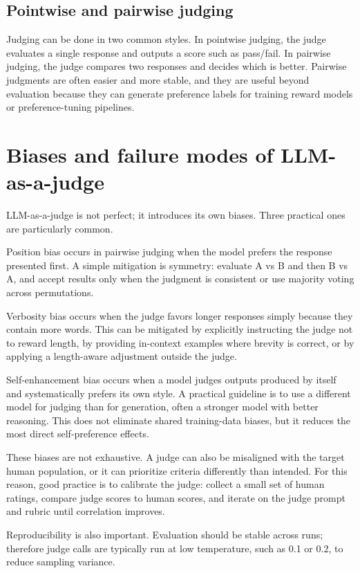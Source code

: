 \subsection{Pointwise and pairwise judging}
Judging can be done in two common styles. In pointwise judging, the judge evaluates a single response and outputs a score such as pass/fail. In pairwise judging, the judge compares two responses and decides which is better. Pairwise judgments are often easier and more stable, and they are useful beyond evaluation because they can generate preference labels for training reward models or preference-tuning pipelines.

\section{Biases and failure modes of LLM-as-a-judge}
LLM-as-a-judge is not perfect; it introduces its own biases. Three practical ones are particularly common.

Position bias occurs in pairwise judging when the model prefers the response presented first. A simple mitigation is symmetry: evaluate A vs B and then B vs A, and accept results only when the judgment is consistent or use majority voting across permutations.

Verbosity bias occurs when the judge favors longer responses simply because they contain more words. This can be mitigated by explicitly instructing the judge not to reward length, by providing in-context examples where brevity is correct, or by applying a length-aware adjustment outside the judge.

Self-enhancement bias occurs when a model judges outputs produced by itself and systematically prefers its own style. A practical guideline is to use a different model for judging than for generation, often a stronger model with better reasoning. This does not eliminate shared training-data biases, but it reduces the most direct self-preference effects.

These biases are not exhaustive. A judge can also be misaligned with the target human population, or it can prioritize criteria differently than intended. For this reason, good practice is to calibrate the judge: collect a small set of human ratings, compare judge scores to human scores, and iterate on the judge prompt and rubric until correlation improves.

Reproducibility is also important. Evaluation should be stable across runs; therefore judge calls are typically run at low temperature, such as 0.1 or 0.2, to reduce sampling variance.

